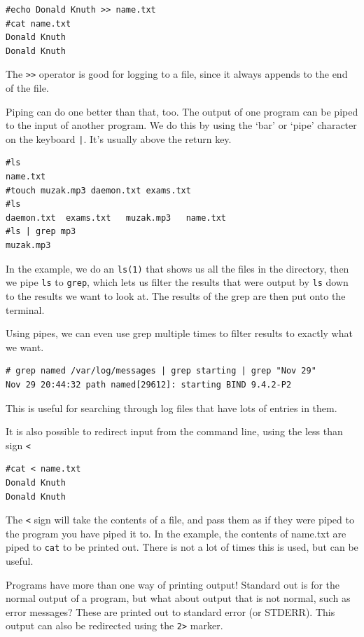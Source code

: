\begin{verbatim}
#echo Donald Knuth >> name.txt
#cat name.txt
Donald Knuth
Donald Knuth
\end{verbatim}

The {\tt >>} operator is good for logging to a file, since it always appends
to the end of the file.

Piping can do one better than that, too. The output of one program can 
be piped to the input of another program. We do this by using the `bar' or 
`pipe' character on the keyboard {\tt |}. It's usually above the return key.

\begin{verbatim}
#ls
name.txt
#touch muzak.mp3 daemon.txt exams.txt
#ls
daemon.txt	exams.txt	muzak.mp3	name.txt
#ls | grep mp3
muzak.mp3
\end{verbatim}

In the example, we do an {\tt ls(1)} that shows us all the files in the directory,
then we pipe {\tt ls} to {\tt grep}, which lets us filter the results that were 
output by {\tt ls} down to the results we want to look at. The results of the 
grep are then put onto the terminal. 

Using pipes, we can even use grep multiple times to filter results to 
exactly what we want.

\begin{verbatim}
# grep named /var/log/messages | grep starting | grep "Nov 29" 
Nov 29 20:44:32 path named[29612]: starting BIND 9.4.2-P2
\end{verbatim}

This is useful for searching through log files that
have lots of entries in them.

It is also possible to redirect input from the command line, using the
less than sign {\tt < }

\begin{verbatim}
#cat < name.txt 
Donald Knuth
Donald Knuth
\end{verbatim}

The {\tt <} sign will take the contents of a file, and 
pass them as if they were piped to the program you 
have piped it to. In the example, the contents of name.txt
are piped to {\tt cat} to be printed out. There is not 
a lot of times this is used, but can be useful.


Programs have more than one way of printing output!
Standard out is for the normal output of a program, but what about 
output that is not normal, such as error messages? These are printed 
out to standard error (or STDERR). This output can also be redirected
using the {\tt 2>} marker.

